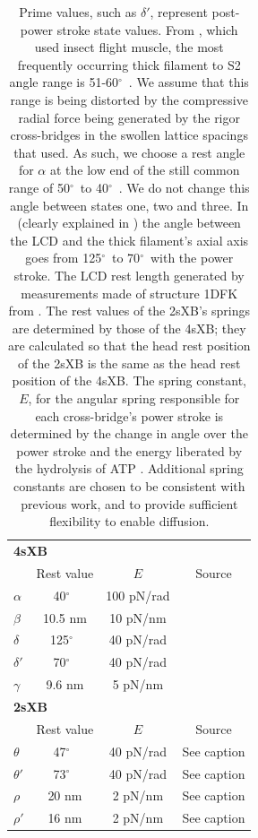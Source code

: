 \documentclass[]{article}
\newcommand{\de}{$^\circ$~} %
\begin{document}
\begin{table}[ft]
    \begin{center}
    \begin{tabular}[t]{|l|ccc|} \hline
    \multicolumn{4}{|l|}{\textbf{4sXB}} \\ 
    \multicolumn{1}{|l}{~} 
              & Rest value & $E$        & Source \\ \cline{2-4}  
    $\alpha$  & 40\de      & 100 pN/rad & \citet{Liu2006}      \\
    $\beta$   & 10.5 nm    & 10 pN/nm   & \citet{Liu2006}      \\
    $\delta$  & 125\de     & 40 pN/rad  & \citet{Taylor1999}   \\
    $\delta'$ & 70\de      & 40 pN/rad  & \citet{Taylor1999}   \\
    $\gamma$  & 9.6 nm     & 5 pN/nm    & \citet{Houdusse2000} \\ \hline
    \multicolumn{4}{|l|}{\textbf{2sXB}} \\ 
    \multicolumn{1}{|l}{~} 
              & Rest value & $E$        & Source      \\ \cline{2-4} 
    $\theta$  & 47\de      & 40 pN/rad  & See caption \\
    $\theta'$ & 73\de      & 40 pN/rad  & See caption \\
    $\rho$    & 20 nm      & 2 pN/nm    & See caption \\
    $\rho'$   & 16 nm      & 2 pN/nm    & See caption \\ \hline
    \end{tabular}
    \end{center}
    \caption{ 
    \label{parameter_table}
    Prime values, such as $\delta'$, represent post-power stroke state values. 
    From \citet{Liu2006}, which used insect flight muscle, the most frequently occurring thick filament to S2 angle range is 51-60\de. 
    We assume that this range is being distorted by the compressive radial force being generated by the rigor cross-bridges in the swollen lattice spacings that \citet{Liu2006} used. 
    As such, we choose a rest angle for $\alpha$ at the low end of the still common range of 50\de to 40\de. 
    We do not change this angle between states one, two and three.
    In \citet{Taylor1999} (clearly explained in \citet{Davis2009}) the angle between the LCD and the thick filament's axial axis goes from 125\de to 70\de with the power stroke. 
    The LCD rest length generated by measurements made of structure 1DFK from \citet{Houdusse2000}. 
    The rest values of the 2sXB's springs are determined by those of the 4sXB; they are calculated so that the head rest position of the 2sXB is the same as the head rest position of the 4sXB\@. 
    The spring constant, $E$, for the angular spring responsible for each cross-bridge's power stroke is determined by the change in angle over the power stroke and the energy liberated by the hydrolysis of ATP \citep{Tanner2007}. 
    Additional spring constants are chosen to be consistent with previous work, and to provide sufficient flexibility to enable diffusion. 
    }
\end{table}
\end{document}
